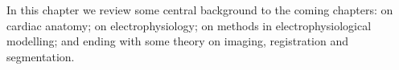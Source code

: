 In this chapter we review some central background to the coming chapters: on cardiac anatomy; on electrophysiology; on methods in electrophysiological modelling; and ending with some theory on imaging, registration and segmentation.
